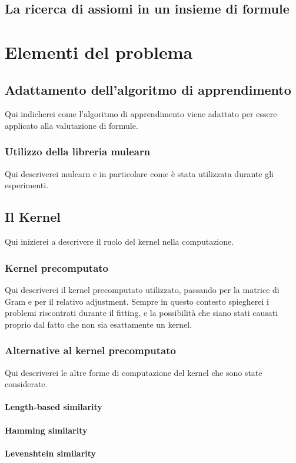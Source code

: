 \documentclass[12pt,a4paper]{report}
\begin{document}
\section{La ricerca di assiomi in un insieme di formule}

\chapter{Elementi del problema}

\section{Adattamento dell'algoritmo di apprendimento}
Qui indicherei come l'algoritmo di apprendimento viene adattato per essere applicato alla valutazione di formule.
\subsection{Utilizzo della libreria mulearn}
Qui descriverei mulearn e in particolare come è stata utilizzata durante gli esperimenti.
\section{Il Kernel}
Qui inizierei a descrivere il ruolo del kernel nella computazione.
\subsection{Kernel precomputato}
Qui descriverei il kernel precomputato utilizzato, passando per la matrice di Gram e per il relativo adjustment. Sempre in questo contesto spiegherei i problemi riscontrati durante il fitting, e la possibilità che siano stati causati proprio dal fatto che non sia esattamente un kernel.
\subsection{Alternative al kernel precomputato}
Qui descriverei le altre forme di computazione del kernel che sono state considerate.
\subsubsection{Length-based similarity}
\subsubsection{Hamming similarity}
\subsubsection{Levenshtein similarity}
\end{document}
